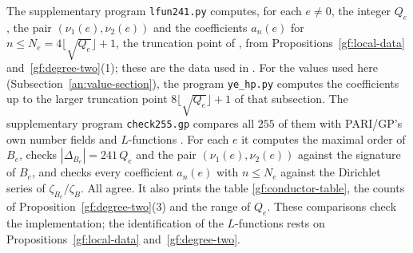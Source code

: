 \begin{remark}\label{gf:checks}
The supplementary program \texttt{lfun241.py} computes, for each $e\ne0$,
the integer $Q_e$, the pair $(\nu_1(e),\nu_2(e))$ and the coefficients
$a_n(e)$ for $n\le N_e=4\lfloor\sqrt{Q_e}\rfloor+1$, the truncation point
of \cite{Naslund04273}, from
Propositions~\ref{gf:local-data} and~\ref{gf:degree-two}(1); these are the
data used in \cite{Naslund04273}. For the values used here
(Subsection~\ref{an:value-section}), the program \texttt{ye\_hp.py} computes
the coefficients up to the larger truncation point
$8\lfloor\sqrt{Q_e}\rfloor+1$ of that subsection. The supplementary program
\texttt{check255.gp} compares all $255$ of them with PARI/GP's own number
fields and $L$-functions \cite{PARI}. For each $e$ it computes the maximal
order of $B_e$, checks $|\Delta_{B_e}|=241\,Q_e$ and the pair
$(\nu_1(e),\nu_2(e))$ against the signature of $B_e$, and checks every
coefficient $a_n(e)$ with $n\le N_e$
against the Dirichlet series of $\zeta_{B_e}/\zeta_B$. All agree. It also
prints the table \eqref{gf:conductor-table}, the counts of
Proposition~\ref{gf:degree-two}(3) and the range of $Q_e$. These comparisons
check the implementation; the identification of the $L$-functions rests on
Propositions~\ref{gf:local-data} and~\ref{gf:degree-two}.
\end{remark}
